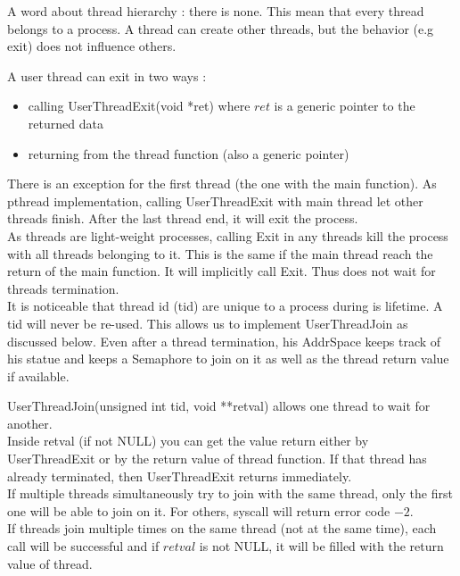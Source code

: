 A word about thread hierarchy : there is none. This mean that every thread
belongs to a process. A thread can create other threads, but the behavior (e.g
exit) does not influence others.

A user thread can exit in two ways :
\begin{itemize}
    \item calling \textrm{UserThreadExit(void *ret)} where $ret$ is a generic
        pointer to the returned data
    \item returning from the thread function (also a generic pointer)
\end{itemize}

There is an exception for the first thread (the one with the main function). As
pthread implementation, calling \textrm{UserThreadExit} with main thread let
other threads finish. After the last thread end, it will exit the process.\\

As threads are light-weight processes, calling \textrm{Exit} in any threads
kill the process with all threads belonging to it. This is the same if the main
thread reach the return of the main function. It will implicitly call
\textrm{Exit}. Thus does not wait for threads termination.\\

It is noticeable that thread id (tid) are unique to a process during is
lifetime. A tid will never be re-used. This allows us to implement
\textrm{UserThreadJoin} as discussed below. Even after a thread termination, his
AddrSpace keeps track of his statue and keeps a Semaphore to join on it as well
as the thread return value if available.

\textrm{UserThreadJoin(unsigned int tid, void **retval)} allows one thread to wait for
another.\\
Inside retval (if not NULL) you can get the value return either by
\textrm{UserThreadExit} or by the return value of thread function. If that
thread has already terminated, then \textrm{UserThreadExit} returns
immediately.\\
If multiple threads simultaneously try to join with the same thread, only the
first one will be able to join on it. For others, syscall will return error
code $-2$. \\
If threads join multiple times on the same thread (not at the same time), each
call will be successful and if $retval$ is not NULL, it will be filled with the
return value of thread.\\

